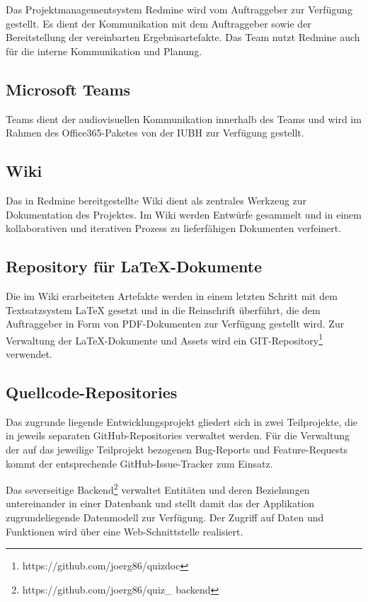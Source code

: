 \documentclass[a4paper,11pt,listof=numbered,glossary=totoc,parskip=half,toc=bib]{scrreprt}
\begin{document}
Das Projektmanagementsystem Redmine wird vom Auftraggeber zur Verfügung gestellt.
Es dient der Kommunikation mit dem Auftraggeber sowie der Bereitstellung der vereinbarten Ergebnisartefakte.
Das Team nutzt Redmine auch für die interne Kommunikation und Planung.

\subsection{Microsoft Teams}

Teams dient der audiovisuellen Kommunikation innerhalb des Teams und wird im Rahmen des Office365-Paketes von der IUBH zur Verfügung gestellt.

\subsection{Wiki}

Das in Redmine bereitgestellte Wiki dient als zentrales Werkzeug zur Dokumentation des Projektes.
Im Wiki werden Entwürfe gesammelt und in einem kollaborativen und iterativen Prozess zu lieferfähigen Dokumenten verfeinert.

\subsection{Repository für LaTeX-Dokumente}

Die im Wiki erarbeiteten Artefakte werden in einem letzten Schritt mit dem Textsatzsystem LaTeX gesetzt und in die Reinschrift überführt, die dem Auftraggeber in Form von PDF-Dokumenten zur Verfügung gestellt wird.
Zur Verwaltung der LaTeX-Dokumente und Assets wird ein GIT-Repository\footnote{https://github.com/joerg86/quizdoc} verwendet.

\subsection{Quellcode-Repositories}

Das zugrunde liegende Entwicklungsprojekt gliedert sich in zwei Teilprojekte, die in jeweils separaten GitHub-Repositories verwaltet werden.
Für die Verwaltung der auf das jeweilige Teilprojekt bezogenen Bug-Reports und Feature-Requests kommt der entsprechende GitHub-Issue-Tracker zum Einsatz.

Das severseitige Backend\footnote{{https://github.com/joerg86/quiz\_ backend}} verwaltet Entitäten und deren Beziehungen untereinander in einer Datenbank und stellt damit das der Applikation zugrundeliegende Datenmodell zur Verfügung. 
Der Zugriff auf Daten und Funktionen wird über eine Web-Schnittstelle realisiert.
\end{document}
